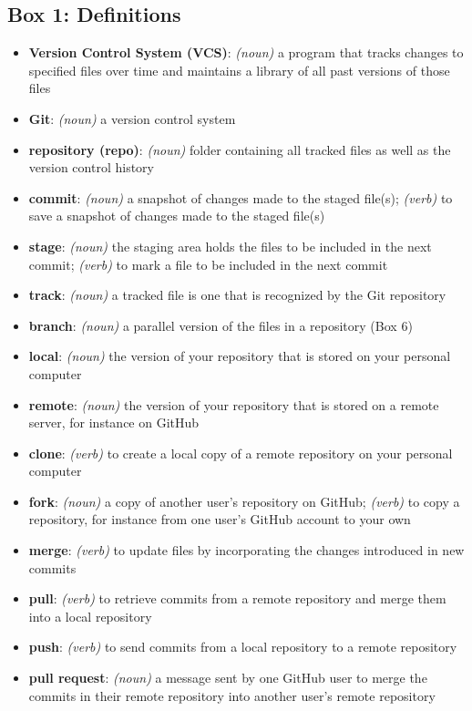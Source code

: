 \subsection{Box 1: Definitions}

\begin{itemize}
\item \textbf{Version Control System (VCS)}: \textit{(noun)} a program that tracks changes to specified files over time and maintains a library of all past versions of those files 
\item \textbf{Git}: \textit{(noun)} a version control system
\item \textbf{repository (repo)}: \textit{(noun)} folder containing all tracked files as well as the version control history
\item \textbf{commit}: \textit{(noun)} a snapshot of changes made to the staged file(s); \textit{(verb)} to save a snapshot of changes made to the staged file(s) 
\item \textbf{stage}: \textit{(noun)} the staging area holds the files to be included in the next commit; \textit{(verb)} to mark a file to be included in the next commit
\item \textbf{track}: \textit{(noun)} a tracked file is one that is recognized by the Git repository
\item \textbf{branch}: \textit{(noun)} a parallel version of the files in a repository (Box 6)
\item \textbf{local}: \textit{(noun)} the version of your repository that is stored on your personal computer
\item \textbf{remote}: \textit{(noun)} the version of your repository that is stored on a remote server, for instance on GitHub
\item \textbf{clone}: \textit{(verb)} to create a local copy of a remote repository on your personal computer
\item \textbf{fork}: \textit{(noun)} a copy of another user's repository on GitHub; \textit{(verb)} to copy a repository, for instance from one user's GitHub account to your own
\item \textbf{merge}: \textit{(verb)} to update files by incorporating the changes introduced in new commits
\item \textbf{pull}: \textit{(verb)} to retrieve commits from a remote repository and merge them into a local repository
\item \textbf{push}: \textit{(verb)} to send commits from a local repository to a remote repository
\item \textbf{pull request}: \textit{(noun)} a message sent by one GitHub user to merge the commits in their remote repository into another user's remote repository
\end{itemize}
